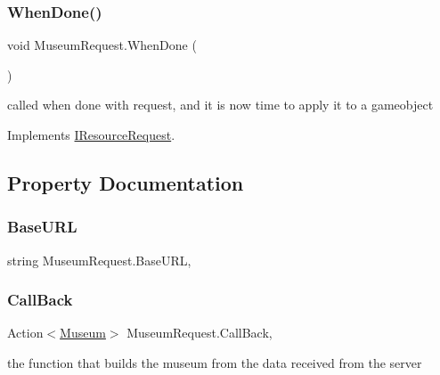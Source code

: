 \subsubsection{\texorpdfstring{When\+Done()}{WhenDone()}}
{\footnotesize\ttfamily void Museum\+Request.\+When\+Done (\begin{DoxyParamCaption}{ }\end{DoxyParamCaption})}



called when done with request, and it is now time to apply it to a gameobject 



Implements \mbox{\hyperlink{interface_i_resource_request_a056e427fa6233602456ccb2d4c405aa0}{I\+Resource\+Request}}.



\subsection{Property Documentation}
\mbox{\label{class_museum_request_a05cd8ccf3dcc6fda7ccd84f8d920f013}} 
\subsubsection{\texorpdfstring{Base\+U\+RL}{BaseURL}}
{\footnotesize\ttfamily string Museum\+Request.\+Base\+U\+RL\hspace{0.3cm}{\ttfamily [get]}, {\ttfamily [set]}}

\mbox{\label{class_museum_request_a004ce0050bd4782e8074937ba3a71724}} 
\subsubsection{\texorpdfstring{Call\+Back}{CallBack}}
{\footnotesize\ttfamily Action$<$\mbox{\hyperlink{class_museum}{Museum}}$>$ Museum\+Request.\+Call\+Back\hspace{0.3cm}{\ttfamily [get]}, {}}



the function that builds the museum from the data received from the server 

